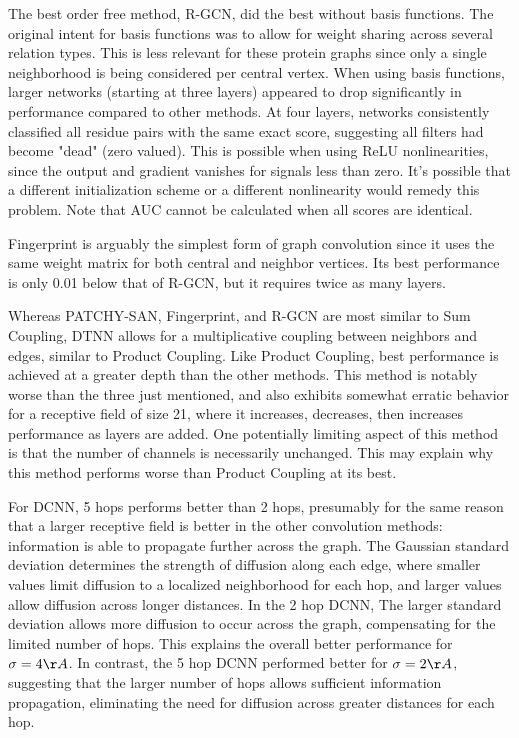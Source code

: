 The best order free method, R-GCN, did the best without basis functions.
The original intent for basis functions was to allow for weight sharing across several relation types.
This is less relevant for these protein graphs since only a single neighborhood is being considered per central vertex. 
When using basis functions, larger networks (starting at three layers) appeared to drop significantly in performance compared to other methods.
At four layers, networks consistently classified all residue pairs with the same exact score, suggesting all filters had become "dead" (zero valued).
This is possible when using ReLU nonlinearities, since the output and gradient vanishes for signals less than zero.
It's possible that a different initialization scheme or a different nonlinearity would remedy this problem.
Note that AUC cannot be calculated when all scores are identical.

Fingerprint is arguably the simplest form of graph convolution since it uses the same weight matrix for both central and neighbor vertices.
Its best performance is only 0.01 below that of R-GCN, but it requires twice as many layers.

Whereas PATCHY-SAN, Fingerprint, and R-GCN are most similar to Sum Coupling, DTNN allows for a multiplicative coupling between neighbors and edges, similar to Product Coupling.
Like Product Coupling, best performance is achieved at a greater depth than the other methods.
This method is notably worse than the three just mentioned, and also exhibits somewhat erratic behavior for a receptive field of size 21, where it increases, decreases, then increases performance as layers are added. 
One potentially limiting aspect of this method is that the number of channels is necessarily unchanged.
This may explain why this method performs worse than Product Coupling at its best.


For DCNN, 5 hops performs better than 2 hops, presumably for the same reason that a larger receptive field is better in the other convolution methods: information is able to propagate further across the graph.
The Gaussian standard deviation determines the strength of diffusion along each edge, where smaller values limit diffusion to a localized neighborhood for each hop, and larger values allow diffusion across longer distances.
In the 2 hop DCNN, The larger standard deviation allows more diffusion to occur across the graph, compensating for the limited number of hops.
This explains the overall better performance for $\sigma=4\AA{}$.
In contrast, the 5 hop DCNN performed better for $\sigma=2\AA{}$, suggesting that the larger number of hops allows sufficient information propagation, eliminating the need for diffusion across greater distances for each hop.


